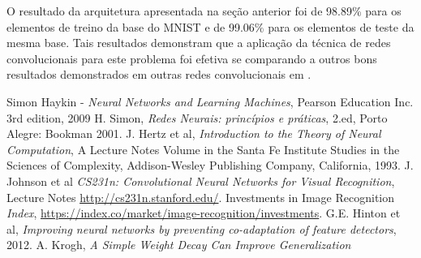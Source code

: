 \documentclass[
	12pt,				%
	oneside,			%
	a4paper,			%
	english,			%
	french,				%
	spanish,			%
	brazil,				%
	]{abntex2}
\begin{document}
\par O resultado da arquitetura apresentada na seção anterior foi de 98.89\% para os elementos de treino da base do MNIST e de 99.06\% para os elementos de teste da mesma base. Tais resultados demonstram que a aplicação da técnica de redes convolucionais para este problema foi efetiva se comparando a outros bons resultados demonstrados em outras redes convolucionais em .








\begin{thebibliography}{1}
	
Simon Haykin - \emph{Neural Networks and Learning Machines}, Pearson Education Inc. 3rd edition, 2009
 H. Simon, \textit{Redes Neurais: princípios e práticas}, 2.ed, Porto Alegre: Bookman 2001.
 J. Hertz et al, \textit{Introduction to the Theory of Neural Computation}, A Lecture Notes Volume in the Santa Fe Institute Studies in the Sciences of Complexity, Addison-Wesley Publishing Company, California, 1993.
 J. Johnson et al \textit{CS231n: Convolutional Neural Networks for Visual Recognition}, Lecture Notes \url{http://cs231n.stanford.edu/}.
 Investments in Image Recognition \textit{Index}, \url{https://index.co/market/image-recognition/investments}.
 G.E. Hinton et al, \textit{Improving neural networks by preventing co-adaptation of feature detectors}, 2012.
 A. Krogh, \textit{A Simple Weight Decay Can Improve Generalization}

\end{thebibliography}



%
%

\end{document}
